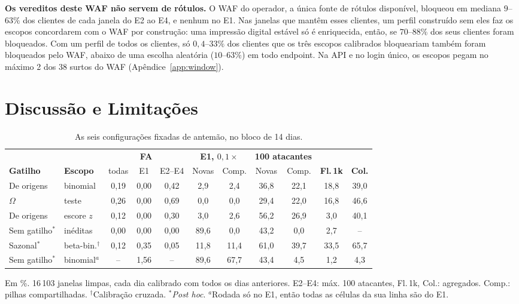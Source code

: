 \documentclass[conference,letterpaper,10pt]{IEEEtran}
\newcommand\1{\textit{(i)}}
\newcommand\2{\textit{(ii)}}
\newcommand\3{\textit{(iii)}}
\begin{document}
\textbf{Os vereditos deste WAF não servem de rótulos.} O WAF do operador, a única fonte de rótulos disponível, bloqueou em mediana $9$--$63\%$ dos clientes de cada janela do E2 ao E4, e nenhum no E1. Nas janelas que mantêm esses clientes, um perfil construído sem eles faz os escopos concordarem com o WAF por construção: uma impressão digital estável só é enriquecida, então, se $70$--$88\%$ dos seus clientes foram bloqueados. Com um perfil de todos os clientes, só $0{,}4$--$33\%$ dos clientes que os três escopos calibrados bloqueariam também foram bloqueados pelo WAF, abaixo de uma escolha aleatória ($10$--$63\%$) em todo endpoint. Na API e no login único, os escopos pegam no máximo 2 dos 38 surtos do WAF (Apêndice~\ref{app:window}).

\section{Discussão e Limitações}
\label{sec:discussion}

\begin{table}[t]
\centering
\caption{As seis configurações fixadas de antemão, no bloco de 14 dias.}
\label{tab:block}
\scriptsize
\setlength{\tabcolsep}{1.6pt}
\begin{tabular}{@{}llccccccccc@{}}
\toprule
 & & \multicolumn{3}{c}{\textbf{FA}} & \multicolumn{2}{c}{\textbf{E1, $0{,}1\times$}} & \multicolumn{2}{c}{\textbf{100 atacantes}} & & \\
\cmidrule(lr){3-5}\cmidrule(lr){6-7}\cmidrule(lr){8-9}
\textbf{Gatilho} & \textbf{Escopo} & todas & E1 & E2--E4 & Novas & Comp. & Novas & Comp. & \textbf{Fl.\,1k} & \textbf{Col.} \\
\midrule
De origens  & binomial              & 0,19 & 0,00 & 0,42 & 2,9  & 2,4  & 36,8 & 22,1 & 18,8 & 39,0 \\
$\Omega$    & teste                 & 0,26 & 0,00 & 0,69 & 0,0  & 0,0  & 29,4 & 22,0 & 16,8 & 46,6 \\
De origens  & escore $z$            & 0,12 & 0,00 & 0,30 & 3,0  & 2,6  & 56,2 & 26,9 & 3,0  & 40,1 \\
Sem gatilho$^{*}$ & inéditas              & 0,00 & 0,00 & 0,00 & 89,6 & 0,0  & 43,2 & 0,0  & 2,7  & --   \\
Sazonal$^{*}$     & beta-bin.$^{\dagger}$ & 0,12 & 0,35 & 0,05 & 11,8 & 11,4 & 61,0 & 39,7 & 33,5 & 65,7 \\
Sem gatilho$^{*}$ & binomial$^{a}$        & --   & 1,56 & --   & 89,6 & 67,7 & 43,4 & 4,5  & 1,2  & 4,3  \\
\bottomrule
\end{tabular}

\vspace{2pt}
{\footnotesize Em \%. 16\,103 janelas limpas, cada dia calibrado com todos os dias anteriores. E2--E4: máx. 100 atacantes, Fl.\,1k, Col.: agregados. Comp.: pilhas compartilhadas. $^{\dagger}$Calibração cruzada. $^{*}$\textit{Post hoc}. $^{a}$Rodada só no E1, então todas as células da sua linha são do E1.}
\end{table}
\end{document}

